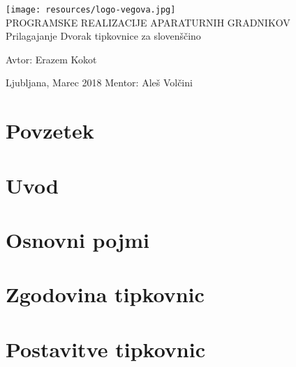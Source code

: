 \documentclass[11pt,a4paper]{article}
\begin{document}
    \begin{titlepage}
        \begin{center}
            \texttt{[image: resources/logo-vegova.jpg]} \\
            \vfill
            \huge{PROGRAMSKE REALIZACIJE APARATURNIH GRADNIKOV} \\
            \huge{Prilagajanje Dvorak tipkovnice za slovenščino}
            \vfill
        \end{center}
        \vfill
        \noindent
        \begin{flushright}
            Avtor: Erazem Kokot \\
        \end{flushright}
        \begin{raggedleft}
            Ljubljana, Marec 2018 \hfill Mentor: Aleš Volčini
        \end{raggedleft}
    \end{titlepage}

    \section*{Povzetek}\label{sec:povzetek}
    
    \newpage

    \tableofcontents
    \newpage

    \listoffigures
    \newpage

    \section{Uvod}\label{sec:uvod}
    
    \newpage

    \section{Osnovni pojmi}\label{sec:pojmi}
    
    \newpage

    \section{Zgodovina tipkovnic}\label{sec:zgodovina}
    
    \newpage

    \section{Postavitve tipkovnic}\label{sec:postavitve-tipkovnic}
    
    \newpage
\end{document}
